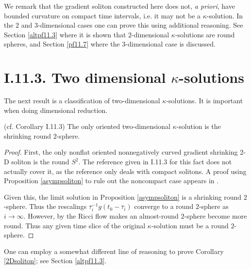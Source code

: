 We remark that the gradient soliton constructed here does
not, {\it a priori}, have bounded curvature on
compact time intervals,
i.e.
it may not be a $\kappa$-solution.  In the $2$ and
$3$-dimensional cases
one can prove this using additional
reasoning.  See Section \ref{altpf11.3} where
it is shown that $2$-dimensional $\kappa$-solutions are
round spheres, and Section \ref{pf11.7} where the $3$-dimensional
case is discussed.


\section{I.11.3. Two dimensional $\kappa$-solutions} \label{I.11.3}

The next result is a classification of two-dimensional
$\kappa$-solutions.  It is important when doing dimensional
reduction.

\begin{corollary}
  \label{cor:kl-two-dimensional-solutions-kappa-solutions-corollary}
 (cf. Corollary I.11.3) \label{2Dsoliton}
The only oriented two-dimensional $\kappa$-solution is
the shrinking round $2$-sphere.
\end{corollary}
\begin{proof}
First, the
only nonflat oriented
nonnegatively curved gradient shrinking 2-D soliton is the
round $S^2$. The reference \cite{Hamsurface} given in I.11.3 for this
fact does not actually cover it, as the reference
only deals with compact solitons. A proof using
Proposition \ref{asympsoliton} to rule
out the noncompact case appears in \cite{Ye2}.

Given this, the limit solution in Proposition \ref{asympsoliton}
is a shrinking round $2$-sphere.  Thus the rescalings
$\overline{\tau}_i^{-1} g(t_0 - \overline{\tau}_i)$ converge to
a round $2$-sphere as $i \rightarrow \infty$.  However, by \cite{Hamsurface}
the Ricci flow makes an
almost-round $2$-sphere become more round. Thus any given time slice
of the original $\kappa$-solution must be a round $2$-sphere.
\end{proof}

\begin{remark}
  \label{rem:kl-two-dimensional-solutions-structural-remark-ricci-solitons}

One can employ a somewhat different
line of reasoning to prove Corollary \ref{2Dsoliton}; see Section
\ref{altpf11.3}.
\end{remark}

